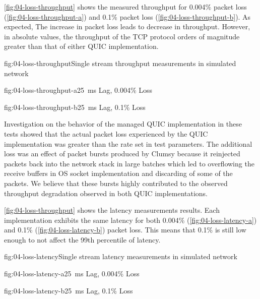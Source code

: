 \autoref{fig:04-loss-throughput} shows the measured throughput for 0.004\% packet loss
(\autoref{fig:04-loss-throughput-a}) and 0.1\% packet loss (\autoref{fig:04-loss-throughput-b}). As
expected, The increase in packet loss leads to decrease in throughput. However, in absolute values,
the throughput of the TCP protocol orders of magnitude greater than that of either QUIC
implementation.

\begin{myFigure}{fig:04-loss-throughput}{Single stream throughput measurements in simulated network}
\begin{mySubfigure}{0.49\linewidth}{fig:04-loss-throughput-a}{\SI{25}{\milli\second} Lag, 0.004\% Loss}
\footnotesize

\end{mySubfigure}
\begin{mySubfigure}{0.49\linewidth}{fig:04-loss-throughput-b}{\SI{25}{\milli\second} Lag, 0.1\% Loss}
\footnotesize

\end{mySubfigure}
\end{myFigure}

Investigation on the behavior of the managed QUIC implementation in these tests showed that the
actual packet loss experienced by the QUIC implementation was greater than the rate set in test
parameters. The additional loss was an effect of packet bursts produced by Clumsy because it
reinjected packets back into the network stack in large batches which led to overflowing the receive
buffers in OS socket implementation and discarding of some of the packets. We believe that these
bursts highly contributed to the observed throughput degradation observed in both QUIC
implementations.

\autoref{fig:04-loss-throughput} shows the latency measurements results. Each implementation
exhibits the same latency for both 0.004\% (\autoref{fig:04-loss-latency-a}) and 0.1\%
(\autoref{fig:04-loss-latency-b}) packet loss. This means that 0.1\% is still low enough to not
affect the 99th percentile of latency.

\begin{myFigure}{fig:04-loss-latency}{Single stream latency measurements in simulated network}
\begin{mySubfigure}{0.49\linewidth}{fig:04-loss-latency-a}{\SI{25}{\milli\second} Lag, 0.004\% Loss}
\footnotesize

\end{mySubfigure}
\begin{mySubfigure}{0.49\linewidth}{fig:04-loss-latency-b}{\SI{25}{\milli\second} Lag, 0.1\% Loss}
\footnotesize

\end{mySubfigure}
\end{myFigure}

